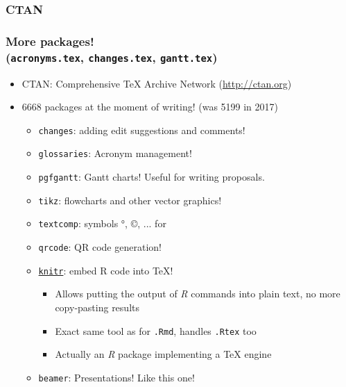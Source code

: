 \documentclass[xetex,colorlinks]{beamer} %
\begin{document}
  \subsubsection{CTAN}
  \begin{frame}
    \frametitle{More packages! \\ (\texttt{acronyms.tex}, \texttt{changes.tex}, \texttt{gantt.tex})}
    \begin{itemize}
     \item CTAN: Comprehensive \TeX{} Archive Network (\href{http://ctan.org}{http://ctan.org})
     \item 6668 packages at the moment of writing! (was 5199 in 2017)
      \begin{itemize}
      \item \texttt{changes}: adding edit suggestions and comments!
      \item \texttt{glossaries}: Acronym management!
      \item \texttt{pgfgantt}: Gantt charts! Useful for writing proposals.
      \item \texttt{tikz}: flowcharts and other vector graphics!
      \item \texttt{textcomp}: symbols °, ©, ... for 
      \item \texttt{qrcode}: QR code generation!
      \item \href{https://github.com/yihui/knitr-examples/blob/master/005-latex.Rtex}{\texttt{knitr}}: embed R code into \TeX{}!
      \begin{itemize}
	\item Allows putting the output of \textit{R} commands into plain text, no more copy-pasting results
	\item Exact same tool as for \texttt{.Rmd}, handles \texttt{.Rtex} too
	\item Actually an \textit{R} package implementing a \TeX{} engine
      \end{itemize}
      \item \texttt{beamer}: Presentations! Like this one!
      \end{itemize}
    \end{itemize}
  \end{frame}
\end{document}
